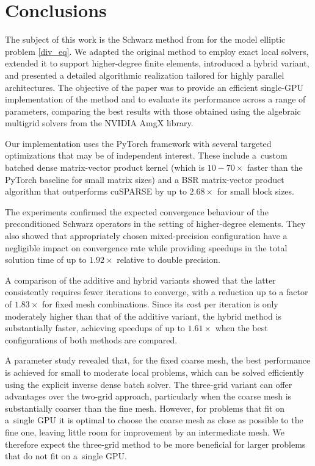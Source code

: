 \documentclass[11pt]{article}
\theoremstyle{definition}
\theoremstyle{theorem}
\begin{document}
\section{Conclusions}

The subject of this work is the Schwarz method from \cite{Przykry} for the
model elliptic problem \eqref{div_eq}. We adapted
the original method to employ exact local solvers, extended it to support higher-degree
finite elements, introduced a hybrid variant, and presented a detailed algorithmic realization
tailored for highly parallel architectures. The objective of the paper
was to provide an efficient single\nobreakdash-GPU implementation of the method and
to evaluate its performance across a range of parameters, comparing the
best results with those obtained using the algebraic multigrid solvers from the NVIDIA AmgX library.

Our implementation uses the PyTorch framework with
several targeted optimizations
that may be of independent interest. These include a~custom batched dense
matrix-vector product kernel (which is $10-70\times$ faster than the PyTorch
baseline for small matrix sizes) and a BSR matrix-vector product algorithm
that outperforms cuSPARSE by up to $2.68\times$ for small block sizes.

The experiments confirmed the expected convergence behaviour of the preconditioned
Schwarz operators in the setting of higher-degree elements. They also showed that
appropriately chosen mixed-precision
configuration have a negligible impact on convergence rate
while providing speedups in the total solution time of
up to $1.92\times$ relative to double precision.

A comparison of the additive and hybrid variants showed that the latter
consistently requires fewer iterations to converge, with a reduction up to
a factor of $1.83\times$ for fixed mesh combinations. Since its cost per iteration
is only moderately higher than that of the additive variant, the hybrid method is
substantially faster, achieving speedups of up to $1.61\times$ when the best
configurations of both methods are compared.

A parameter study revealed that, for the fixed coarse mesh, the best performance
is achieved for small to moderate local problems, which can be solved efficiently
using the explicit inverse dense batch solver. The three-grid
variant can offer advantages over the two\nobreakdash-grid approach, particularly
when the coarse mesh is substantially coarser than the fine mesh.
However, for problems that fit on a~single GPU it is optimal to choose the coarse
mesh as close as possible to the fine one, leaving
little room for improvement by an intermediate mesh. We therefore expect the
three\nobreakdash-grid method to be more beneficial for larger problems
that do not fit on a~single GPU.
\end{document}
